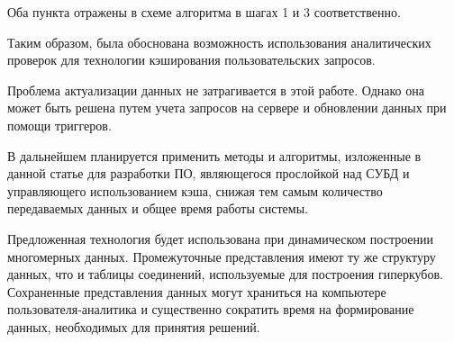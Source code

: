 \documentclass{cmi}
\begin{document}
Оба пункта отражены в схеме алгоритма в шагах 1 и 3 соответственно.

Таким образом, была обоснована возможность использования аналитических проверок для технологии кэширования пользовательских запросов.

Проблема актуализации данных не затрагивается в этой работе. Однако она может быть решена
путем учета запросов на сервере и обновлении данных при помощи триггеров.

В дальнейшем планируется применить методы и алгоритмы, изложенные в данной статье для разработки ПО, являющегося прослойкой над СУБД и управляющего использованием кэша, снижая тем самым количество передаваемых данных и общее время работы системы.

Предложенная технология будет использована при динамическом построении многомерных данных.
Промежуточные представления имеют ту же структуру данных, что и таблицы соединений, используемые для
построения гиперкубов. Сохраненные представления данных могут храниться на компьютере пользователя-аналитика и существенно сократить время на формирование данных, необходимых для принятия решений.
\end{document}
